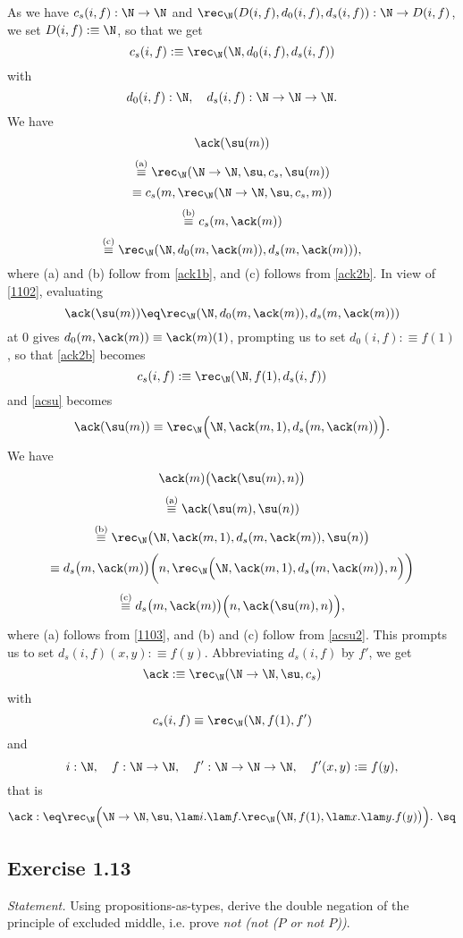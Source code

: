 \documentclass[12pt]{article}
\begin{document}
\nn As we have $c_s(i,f):\N\to\N$ and $\rec_\N(D(i,f),d_0(i,f),d_s(i,f)):\N\to D(i,f)$, we set $D(i,f):\equiv\N$, so that we get 
\begin{equation}\label{ack2b}
c_s(i,f):\equiv\rec_\N(\N,d_0(i,f),d_s(i,f))
\end{equation} 
with 
$$
d_0(i,f):\N,\quad d_s(i,f):\N\to\N\to\N.
$$ 
We have 
%
$$\ack(\su(m))$$
$$\overset{\text{(a)}}\equiv\rec_\N(\N\to\N,\su,c_s,\su(m))$$
$$\equiv c_s(m,\rec_\N(\N\to\N,\su,c_s,m))$$
$$\overset{\text{(b)}}\equiv c_s(m,\ack(m))$$
$$\overset{\text{(c)}}\equiv\rec_\N(\N,d_0(m,\ack(m)),d_s(m,\ack(m))),$$ 
where (a) and (b) follow from \eqref{ack1b}, and (c) follows from \eqref{ack2b}. In view of \eqref{1102}, evaluating 
\begin{equation}\label{acsu}
\ack(\su(m))\eq\rec_\N(\N,d_0(m,\ack(m)),d_s(m,\ack(m)))
\end{equation} 
at 0 gives $d_0(m,\ack(m))\equiv\ack(m)(1)$, prompting us to set $d_0(i,f):\equiv f(1)$, so that \eqref{ack2b} becomes 
\begin{equation}\label{ack2c}
c_s(i,f):\equiv\rec_\N(\N,f(1),d_s(i,f))
\end{equation} 
and \eqref{acsu} becomes
\begin{equation}\label{acsu2}
\ack(\su(m))\equiv\rec_\N\Big(\N,\ack(m,1),d_s\big(m,\ack(m)\big)\Big).
\end{equation} 
We have 
$$\ack(m)\big(\ack(\su(m),n)\big)$$ 
$$\overset{\text{(a)}}\equiv\ack(\su(m),\su(n))$$ 
$$\overset{\text{(b)}}\equiv\rec_\N\big(\N,\ack(m,1),d_s(m,\ack(m)),\su(n)\big)$$ 
$$\equiv d_s\big(m,\ack(m)\big)\bigg(n,\rec_\N\Big(\N,\ack(m,1),d_s\big(m,\ack(m)\big),n\Big)\bigg)$$ 
$$\overset{\text{(c)}}\equiv d_s\big(m,\ack(m)\big)\Big(n,\ack\big(\su(m),n\big)\Big),$$ 
where (a) follows from \eqref{1103}, and (b) and (c) follow from \eqref{acsu2}. This prompts us to set $d_s(i,f)(x,y):\equiv f(y)$. Abbreviating $d_s(i,f)$ by $f'$, we get  
$$
\ack:\equiv\rec_\N(\N\to\N,\su,c_s)
$$ 
with 
$$ 
c_s(i,f)\equiv\rec_\N(\N,f(1),f')
$$ 
and 
$$ 
i:\N,\quad f:\N\to\N,\quad f':\N\to\N\to\N,\quad f'(x,y):\equiv f(y),
$$ 
that is
$$
\ack:\eq\rec_\N\Big(\N\to\N,\su,\lam i.\lam f.\rec_\N\big(\N,f(1),\lam x.\lam y.f(y)\big)\Big).\ \sq
$$ 


\subsection{Exercise 1.13}

\emph{Statement.} Using propositions-as-types, derive the double negation of the principle of excluded middle, i.e. prove \emph{not (not ($P$ or not $P$))}.
\end{document}
